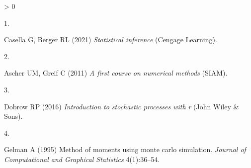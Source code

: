\documentclass[9pt,twocolumn,twoside,]{pnas-new}
\newlength{\csllabelwidth}
\newlength{\cslhangindent}
\newenvironment{CSLReferences}[2] %
 {%
  \setlength{\parindent}{0pt}
  \ifodd #1 \everypar{\setlength{\hangindent}{\cslhangindent}}\ignorespaces\fi
  \ifnum #2 > 0
  \setlength{\parskip}{#2\baselineskip}
  \fi
 }%
 {}
\newcommand{\CSLLeftMargin}[1]{\parbox[t]{\csllabelwidth}{#1}}
\newcommand{\CSLRightInline}[1]{\parbox[t]{\linewidth - \csllabelwidth}{#1}\break}
\begin{document}
\showmatmethods
\showacknow
\pnasbreak

\hypertarget{refs}{}
\begin{CSLReferences}{0}{0}
\leavevmode\hypertarget{ref-casella2021statistical}{}%
\CSLLeftMargin{1. }
\CSLRightInline{Casella G, Berger RL (2021) \emph{Statistical inference}
(Cengage Learning).}

\leavevmode\hypertarget{ref-ascher2011first}{}%
\CSLLeftMargin{2. }
\CSLRightInline{Ascher UM, Greif C (2011) \emph{A first course on
numerical methods} (SIAM).}

\leavevmode\hypertarget{ref-dobrow2016introduction}{}%
\CSLLeftMargin{3. }
\CSLRightInline{Dobrow RP (2016) \emph{Introduction to stochastic
processes with r} (John Wiley \& Sons).}

\leavevmode\hypertarget{ref-mainArt}{}%
\CSLLeftMargin{4. }
\CSLRightInline{Gelman A (1995) Method of moments using monte carlo
simulation. \emph{Journal of Computational and Graphical Statistics}
4(1):36--54.}

\end{CSLReferences}



% 
\end{document}
